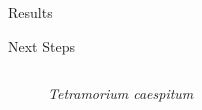 \begin{section}{Results}
\begin{frame}{Next Steps}
\begin{columns}[T,onlytextwidth]
\begin{figure}
        \caption{\textit{Tetramorium caespitum} \scriptsize{\cite{spE2-XL.jpg_????}}}
\end{figure}
\end{columns}
\end{frame}





\end{section}